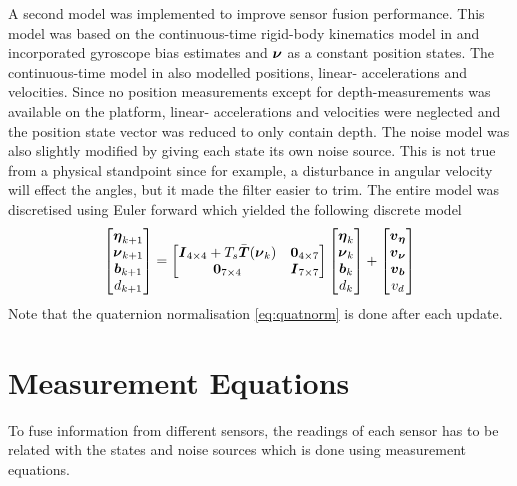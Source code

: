 A second model was implemented to improve sensor fusion performance. This model was based on the continuous-time rigid-body kinematics model in \citet[p. 351]{sensorfusion} and incorporated gyroscope bias estimates and $\boldsymbol{\nu}$ as a constant position states. The continuous-time model in \citet[p. 351]{sensorfusion} also modelled positions, linear- accelerations and velocities. Since no position measurements except for depth-measurements was available on the \abbrROV platform, linear- accelerations and velocities were neglected and the position state vector was reduced to only contain depth. The noise model was also slightly modified by giving each state its own noise source. This is not true from a physical standpoint since for example, a disturbance in angular velocity will effect the angles, but it made the filter easier to trim. The entire model was discretised using Euler forward which yielded the following discrete model
\begin{equation}\label{eq:expanded_model}
\begin{bmatrix}
\boldsymbol{\eta}_{k+1}\\
\boldsymbol{\nu}_{k+1}\\
\boldsymbol{b}_{k+1}\\
d_{k+1}
\end{bmatrix}=
\begin{bmatrix}
\boldsymbol{I}_{4\times4} + T_s \bar{\boldsymbol{T}}(\boldsymbol{\nu}_{k})& \boldsymbol{0}_{4\times7}\\
\boldsymbol{0}_{7\times4} & \boldsymbol{I}_{7\times7}\\
\end{bmatrix}
\begin{bmatrix}
\boldsymbol{\eta}_{k}\\
\boldsymbol{\nu}_{k}\\
\boldsymbol{b}_{k}\\
d_{k}
\end{bmatrix}
+\begin{bmatrix}
  \boldsymbol{v}_{\boldsymbol{\eta}}\\
  \boldsymbol{v}_{\boldsymbol{\nu}}\\
  \boldsymbol{v}_{\boldsymbol{b}}\\
  v_d 
\end{bmatrix}
\end{equation}
Note that the quaternion normalisation \eqref{eq:quatnorm} is done after each update.
\section{Measurement Equations}\label{sec:Meas}
To fuse information from different sensors, the readings of each sensor has to be related with the states and noise sources which is done using measurement equations.

